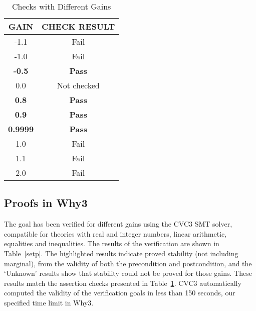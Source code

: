 \documentclass[a4paper]{article}
\begin{document}
\begin{table}[!t]
\renewcommand{\arraystretch}{1.3}
\caption{Checks with Different Gains}
\label{check}
\centering
\begin{tabular}{|c|c|}
\hline
GAIN&CHECK RESULT\\ \hline \hline
-1.1&Fail \\ \hline
-1.0&Fail \\ \hline
\textbf{-0.5}&\textbf{Pass} \\ \hline
0.0&Not checked\\ \hline
\textbf{0.8}&\textbf{Pass}\\ \hline
\textbf{0.9}&\textbf{Pass}\\ \hline
\textbf{0.9999}&\textbf{Pass}\\ \hline 
1.0&Fail \\ \hline
1.1&Fail \\ \hline
2.0&Fail \\ \hline
\end{tabular}
\vspace{-0.1cm}
\end{table}

\subsection{Proofs in Why3}
The goal has been verified for different gains using the CVC3 SMT solver, compatible for theories with real and integer numbers, linear arithmetic, equalities and inequalities. The results of the verification are shown in Table~\ref{setp}. The highlighted results indicate proved stability (not including marginal), from the validity of both the precondition and postcondition, and the `Unknown' results show that stability could not be proved for those gains. These results match the assertion checks presented in Table~\ref{check}. CVC3 automatically computed the validity of the verification goals in less than 150 seconds, our specified time limit in Why3. 
\end{document}
